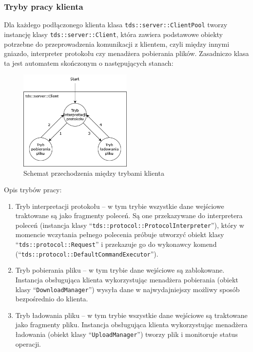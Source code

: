\documentclass[8pt,a4paper]{article}
\newcommand{\quotes}[1]{``#1''}
\newcommand{\quotcode}[1]{\quotes{\texttt{#1}}}
\begin{document}
\subsubsection{Tryby pracy klienta}
Dla każdego podłączonego klienta klasa \texttt{tds::server::ClientPool} tworzy instancję klasy \texttt{tds::server::Client}, która zawiera podstawowe obiekty potrzebne do przeprowadzenia komunikacji z klientem, czyli między innymi gniazdo, interpreter protokołu czy menadżera pobierania plików. Zasadniczo klasa ta jest automatem skończonym o następujących stanach:
\begin{figure}[ht]
\centering
\includegraphics[width=0.5\textwidth]{img/server-cstates.png}
\caption{\label{fig:server-cstates.png}Schemat przechodzenia między trybami klienta}
\end{figure}
\FloatBarrier
\noindent Opis trybów pracy:
\begin{enumerate}
    \item Tryb interpretacji protokołu -- w tym trybie wszystkie dane wejściowe traktowane są jako fragmenty poleceń. Są one przekazywane do interpretera poleceń (instancja klasy \quotcode{tds::protocol::ProtocolInterpreter}), który w momencie wczytania pełnego polecenia próbuje utworzyć obiekt klasy \quotcode{tds::protocol::Request} i przekazuje go do wykonawcy komend (\quotcode{tds::protocol::DefaultCommandExecutor}).
    \item Tryb pobierania pliku -- w tym trybie dane wejściowe są zablokowane. Instancja obsługująca klienta wykorzystując menadżera pobierania (obiekt klasy \quotcode{DownloadManager}) wysyła dane w najwydajniejszy możliwy sposób bezpośrednio do klienta.
    \item Tryb ładowania pliku -- w tym trybie wszystkie dane wejściowe są traktowane jako fragmenty pliku. Instancja obsługująca klienta wykorzystując menadżera ładowania (obiekt klasy \quotcode{UploadManager}) tworzy plik i monitoruje status operacji.
\end{enumerate}
\end{document}
